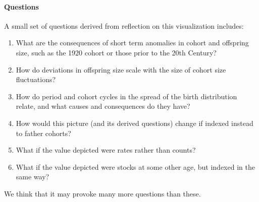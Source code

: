 \paragraph{Questions}
A small set of questions derived from reflection on this visualization includes:
\begin{enumerate}
\item What are the consequences of short term anomalies in cohort and offspring size, such as the 1920 cohort or those prior to the 20th Century? 
\item How do deviations in offspring size scale with the size of cohort size fluctuations? 
\item How do period and cohort cycles in the spread of the birth distribution relate, and what causes and consequences do they have?
\item How would this picture (and its derived questions) change if indexed instead to father cohorts?
\item What if the value depicted were rates rather than counts?
\item What if the value depicted were stocks at some other age, but indexed in the same way?
\end{enumerate}

We think that it may provoke many more questions than these.